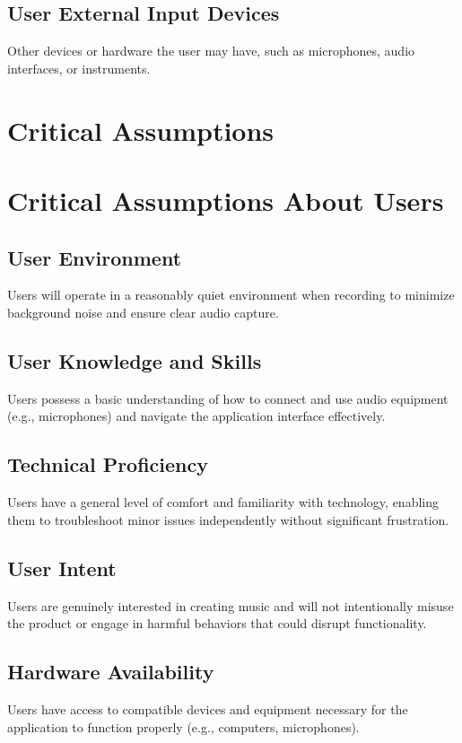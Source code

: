 \documentclass{article}
\begin{document}
\subsection{User External Input Devices}
Other devices or hardware the user may have, such as microphones, audio interfaces, or instruments.

\section{Critical Assumptions}

\section*{Critical Assumptions About Users}

\subsection*{User Environment}
Users will operate in a reasonably quiet environment when recording to minimize background noise and ensure clear audio capture.

\subsection*{User Knowledge and Skills}
Users possess a basic understanding of how to connect and use audio equipment (e.g., microphones) and navigate the application interface effectively.

\subsection*{Technical Proficiency}
Users have a general level of comfort and familiarity with technology, enabling them to troubleshoot minor issues independently without significant frustration.

\subsection*{User Intent}
Users are genuinely interested in creating music and will not intentionally misuse the product or engage in harmful behaviors that could disrupt functionality.

\subsection*{Hardware Availability}
Users have access to compatible devices and equipment necessary for the application to function properly (e.g., computers, microphones).
\end{document}
